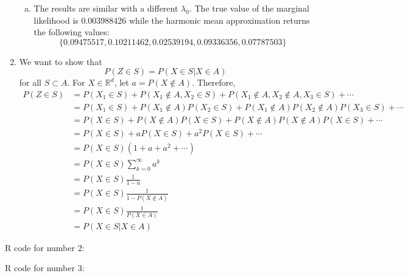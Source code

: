 \documentclass{article}
\begin{document}
\begin{enumerate}
\begin{enumerate}[(a)]
\item The results are similar with a different $\lambda_0$. The true value of the marginal likelihood is 0.003988426 while the harmonic mean approximation returns the following values:
$$\{0.09475517, 0.10211462, 0.02539194, 0.09336356, 0.07787503\}$$
\end{enumerate}

\setcounter{enumi}{4}

\item We want to show that
$$ P(Z \in S) = P(X \in S | X \in A) $$
for all $S\subset A$. For $X\in \mathds{R}^d$, let $a=P(X\notin A)$. Therefore,
\begin{align*}
P(Z\in S) &= P(X_1 \in S) + P(X_1 \notin A, X_2 \in S) + P(X_1 \notin A, X_2\notin A, X_3 \in S)+ \cdots \\
&=P(X_1 \in S) + P(X_1\notin A)P(X_2\in S) + P(X_1 \notin A)P(X_2\notin A)P(X_3\in S) + \cdots \\
&=P(X \in S) + P(X\notin A)P(X\in S) + P(X \notin A)P(X\notin A)P(X\in S) + \cdots \\
&=P(X \in S) + aP(X\in S) + a^2P(X\in S) + \cdots \\
&=P(X \in S) (1+a+a^2+\cdots) \\
&=P(X \in S)\sum\nolimits_{k=0}^{\infty} a^k \\
&=P(X \in S)\frac{1}{1-a} \\
&=P(X \in S)\frac{1}{1-P(X\notin A)} \\
&=P(X \in S)\frac{1}{P(X\in A)} \\
&=P(X \in S | X \in A)
\end{align*}
\end{enumerate}


\pagebreak
R code for number 2:

\pagebreak
R code for number 3:
\end{document}
